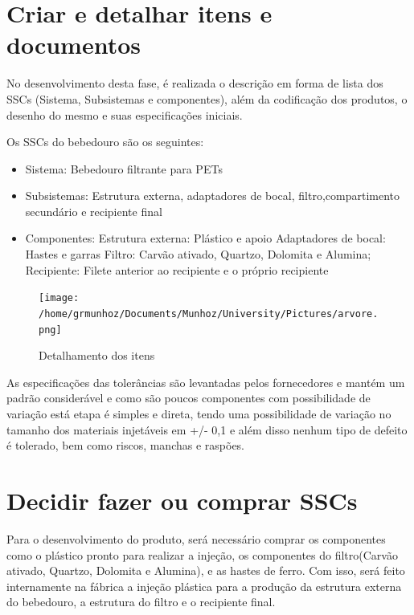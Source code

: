 \documentclass[
	12pt,				%
	openright,			%
	oneside,			%
	a4paper,			%
	english,			%
	french,				%
	spanish,			%
	brazil				%
	]{abntex2}
\begin{document}
\section{Criar e detalhar itens e documentos}

No desenvolvimento desta fase, é realizada o descrição em forma de lista dos SSCs (Sistema, Subsistemas e componentes), além da codificação dos produtos, o desenho do mesmo e suas especificações iniciais.

Os SSCs do bebedouro são os seguintes:

\begin{itemize}
\item Sistema: Bebedouro filtrante para PETs
\item Subsistemas: Estrutura externa, adaptadores de bocal, filtro,compartimento secundário e recipiente final
\item Componentes: 
\subitem Estrutura externa: Plástico e apoio
\subitem Adaptadores de bocal: Hastes e garras
\subitem Filtro: Carvão ativado,  Quartzo, Dolomita e Alumina;
\subitem Recipiente: Filete anterior ao recipiente e o próprio recipiente
\end{itemize}

\begin{figure}[H]
\begin{center}
\caption{Detalhamento dos itens}
\texttt{[image: /home/grmunhoz/Documents/Munhoz/University/Pictures/arvore.png]} 
\label{figetapas}
\end{center}
\end{figure}

As especificações das tolerâncias são levantadas pelos fornecedores e mantém um padrão considerável e como são poucos componentes com possibilidade de variação está etapa é simples e direta, tendo uma possibilidade de variação no tamanho dos materiais injetáveis em  +/- 0,1 e além disso nenhum tipo de defeito é tolerado, bem como riscos, manchas e raspões.

\section{Decidir fazer ou comprar SSCs}

Para o desenvolvimento do produto, será necessário comprar os componentes como o plástico pronto para realizar a injeção, os componentes do filtro(Carvão ativado,  Quartzo, Dolomita e Alumina), e as hastes de ferro. Com isso, será feito internamente na fábrica a injeção plástica para a produção da estrutura externa do bebedouro, a estrutura do filtro e o recipiente final.
\end{document}
